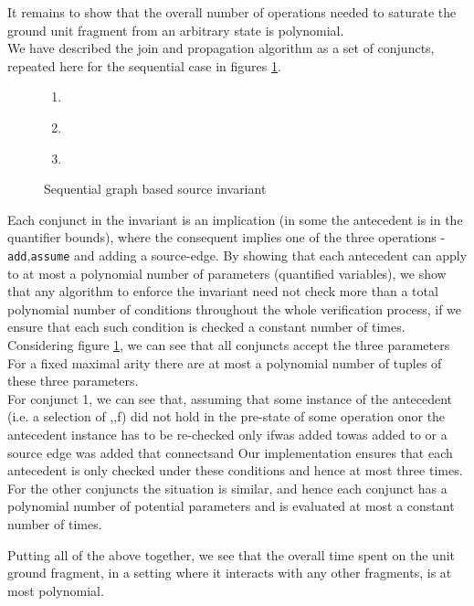 It remains to show that the overall number of operations needed to saturate the ground unit fragment from an arbitrary state is polynomial.\\
We have described the join and propagation algorithm as a set of conjuncts, repeated here for the sequential case in figures \ref{sequential_weak_source_invariant_2}.
\begin{figure}
\begin{enumerate}
	\item {}\\
	\item {}\\
	\item {}\\
\end{enumerate}
\caption{Sequential graph based source invariant}
\label{sequential_weak_source_invariant_2}
\end{figure}
Each conjunct in the invariant is an implication (in some the antecedent is in the quantifier bounds), 
where the consequent implies one of the three operations - \lstinline|add|,\lstinline|assume| and adding a source-edge.
By showing that each antecedent can apply to at most a polynomial number of parameters (quantified variables), 
we show that any algorithm to enforce the invariant need not check more than a total polynomial number of conditions throughout the whole verification process, if we ensure that each such condition is checked a constant number of times.\\
Considering figure \ref{sequential_weak_source_invariant_2}, we can see that all conjuncts accept the three parameters  For a fixed maximal arity there are at most a polynomial number of tuples of these three parameters.\\
For conjunct 1, we can see that, assuming that some instance of the antecedent (i.e. a selection of ,,f) did not hold in the pre-state of some operation onor the antecedent instance has to be re-checked only ifwas added towas added to or a source edge was added that connectsand Our implementation ensures that each antecedent is only checked under these conditions and hence at most three times. For the other conjuncts the situation is similar, and hence each conjunct has a polynomial number of potential parameters and is evaluated at most a constant number of times.

Putting all of the above together, we see that the overall time spent on the unit ground fragment, in a setting where it interacts with any other fragments, is at most polynomial.
